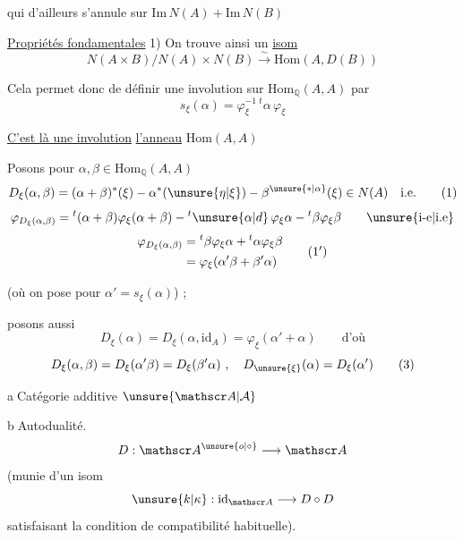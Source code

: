 
qui d'ailleurs s'annule sur $\mathrm{Im}\,N(A)+\mathrm{Im}\,N(B)$

\uline{Propriétés fondamentales} 1) On trouve ainsi un \uline{isom}
\[
N(A\times B)/N(A)\times N(B)\xrightarrow{\sim}\mathrm{Hom}(A,D(B))
\]


 Cela permet donc de définir une involution sur $\mathrm{Hom}_{\mathbb Q}(A,A)$ par
\[
s_\xi(\alpha)=\varphi_\xi^{-1}\,{}^t\alpha\,\varphi_\xi
\]

\uline{C'est là une involution} \uline{} \uline{l'anneau} $\mathrm{Hom}(A,A)$

Posons pour $\alpha,\beta\in\mathrm{Hom}_{\mathbb Q}(A,A)$
\[
D_\xi(\alpha,\beta)=(\alpha+\beta)^*(\xi)-\alpha^*(\unsure{\eta|\xi})-\beta^{\unsure{*|\alpha}}(\xi)\in N(A)\quad\text{i.e.}
\tag*{(1)}
\]
\[
\varphi_{D_\xi(\alpha,\beta)}={}^{t}(\alpha+\beta)\varphi_\xi(\alpha+\beta)-{}^{t}\unsure{\alpha|d}\,\varphi_\xi\alpha-{}^{t}\beta\varphi_\xi\beta\qquad\text{\unsure{i-e|i.e}}
\]
\[
\begin{aligned}
\varphi_{D_\xi(\alpha,\beta)}&={}^{t}\beta\varphi_\xi\alpha+{}^{t}\alpha\varphi_\xi\beta\\
&=\varphi_\xi(\alpha'\beta+\beta'\alpha)
\end{aligned}\tag*{(1\ensuremath{^{\prime}})}
\]

(où on pose pour  $\alpha'=s_\xi(\alpha)$) ; 

posons aussi
\[
D_\xi(\alpha)=D_\xi(\alpha,\mathrm{id}_A)=\varphi_\xi(\alpha'+\alpha)\qquad\text{d'où}
\tag*{(2)}
\]
\[
D_\xi(\alpha,\beta)=D_\xi(\alpha'\beta)=D_\xi(\beta'\alpha)\ ,\quad D_{\unsure{\xi}}(\alpha)=D_\xi(\alpha')
\tag*{(3)}
\]


\textcircled{a}\quad Catégorie additive $\unsure{\mathscr A|\mathcal A}$

\textcircled{b}\quad Autodualité.
\[
 D:\mathscr A^{\unsure{o|\circ}}\longrightarrow\mathscr A
\]
(munie d'un isom
\[
 \unsure{k|\kappa}:\mathrm{id}_{\mathscr A}\longrightarrow D\circ D
\]
satisfaisant la condition de compatibilité habituelle).


